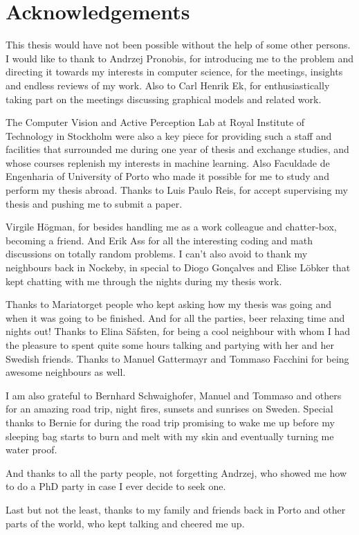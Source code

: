 \chapter*{Acknowledgements}
This thesis would have not been possible without the help of some other persons.
I would like to thank to Andrzej Pronobis, for introducing me to the problem and
directing it towards my interests in computer science, for the meetings, insights
and endless reviews of my work. Also to Carl Henrik Ek, for enthusiastically taking part
on the meetings discussing graphical models and related work.

The Computer Vision and Active Perception Lab at Royal Institute of Technology
in Stockholm were also a key piece for providing such a staff and facilities that
surrounded me during one year of thesis and exchange studies, and whose
courses replenish my interests in machine learning.
Also Faculdade de Engenharia of University of Porto who made it possible
for me to study and perform my thesis abroad.
Thanks to Luis Paulo Reis, for accept supervising my thesis and pushing me to submit a paper.

Virgile Högman, for besides handling me as a work colleague and chatter-box, becoming a friend.
And Erik Ass for all the interesting coding and math discussions on totally random problems.
I can't also avoid to thank my neighbours back in Nockeby, in special to Diogo Gonçalves and Elise Löbker
that kept chatting with me through the nights during my thesis work.

Thanks to Mariatorget people who kept asking how my thesis was going and when it was going to be finished.
And for all the parties, beer relaxing time and nights out! Thanks to Elina Säfsten, for being a cool neighbour
with whom I had the pleasure to spent quite some hours talking and partying with her and her Swedish friends.
Thanks to Manuel Gattermayr and Tommaso Facchini for being awesome neighbours as well.

I am also grateful to Bernhard Schwaighofer, Manuel and Tommaso and others for an amazing
road trip, night fires, sunsets and sunrises on Sweden. Special thanks to Bernie for during the road trip
promising to wake me up before my sleeping bag starts to burn and melt with my skin and eventually turning me water proof.

And thanks to all the party people, not forgetting Andrzej, who showed me how to do a PhD party in case I ever decide
to seek one.

Last but not the least, thanks to my family and friends back in Porto and other parts of the world,
who kept talking and cheered me up.


\vspace{10mm}

